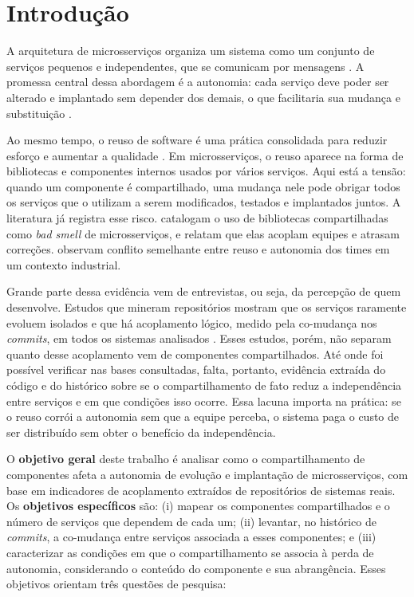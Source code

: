 \section{Introdução}
\label{sec:introducao}

A arquitetura de microsserviços organiza um sistema como um conjunto de serviços pequenos e independentes, que se comunicam por mensagens \cite{dragoni2017}. A promessa central dessa abordagem é a autonomia: cada serviço deve poder ser alterado e implantado sem depender dos demais, o que facilitaria sua mudança e substituição \cite{bogner2021}.

Ao mesmo tempo, o reuso de software é uma prática consolidada para reduzir esforço e aumentar a qualidade \cite{krueger1992,frakes2005}. Em microsserviços, o reuso aparece na forma de bibliotecas e componentes internos usados por vários serviços. Aqui está a tensão: quando um componente é compartilhado, uma mudança nele pode obrigar todos os serviços que o utilizam a serem modificados, testados e implantados juntos. A literatura já registra esse risco.  catalogam o uso de bibliotecas compartilhadas como \textit{bad smell} de microsserviços, e  relatam que elas acoplam equipes e atrasam correções.  observam conflito semelhante entre reuso e autonomia dos times em um contexto industrial.

Grande parte dessa evidência vem de entrevistas, ou seja, da percepção de quem desenvolve. Estudos que mineram repositórios mostram que os serviços raramente evoluem isolados \cite{assuncao2023} e que há acoplamento lógico, medido pela co-mudança nos \textit{commits}, em todos os sistemas analisados \cite{aragona2023}. Esses estudos, porém, não separam quanto desse acoplamento vem de componentes compartilhados. Até onde foi possível verificar nas bases consultadas, falta, portanto, evidência extraída do código e do histórico sobre se o compartilhamento de fato reduz a independência entre serviços e em que condições isso ocorre. Essa lacuna importa na prática: se o reuso corrói a autonomia sem que a equipe perceba, o sistema paga o custo de ser distribuído sem obter o benefício da independência.

O \textbf{objetivo geral} deste trabalho é analisar como o compartilhamento de componentes afeta a autonomia de evolução e implantação de microsserviços, com base em indicadores de acoplamento extraídos de repositórios de sistemas reais. Os \textbf{objetivos específicos} são: (i) mapear os componentes compartilhados e o número de serviços que dependem de cada um; (ii) levantar, no histórico de \textit{commits}, a co-mudança entre serviços associada a esses componentes; e (iii) caracterizar as condições em que o compartilhamento se associa à perda de autonomia, considerando o conteúdo do componente e sua abrangência. Esses objetivos orientam três questões de pesquisa:


